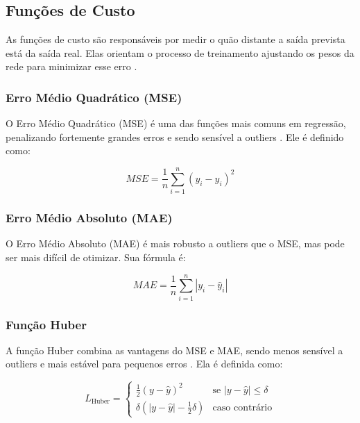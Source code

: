 \subsection{Funções de Custo}

As funções de custo são responsáveis por medir o quão distante a saída prevista está da saída real. Elas orientam o processo de treinamento ajustando os pesos da rede para minimizar esse erro \cite{rashid2020survey}.

\subsubsection{Erro Médio Quadrático (MSE)}

O Erro Médio Quadrático (MSE) é uma das funções mais comuns em regressão, penalizando fortemente grandes erros e sendo sensível a outliers \cite{goodfellow2016deep}. Ele é definido como:

\begin{equation}
    MSE = \frac{1}{n} \sum_{i=1}^{n} (y_i - \hat{y}_i)^2
    \label{eq:mse}
\end{equation}

\subsubsection{Erro Médio Absoluto (MAE)}

O Erro Médio Absoluto (MAE) é mais robusto a outliers que o MSE, mas pode ser mais difícil de otimizar. Sua fórmula é:

\begin{equation}
    MAE = \frac{1}{n} \sum_{i=1}^{n} |y_i - \hat{y}_i|
    \label{eq:mae}
\end{equation}

\subsubsection{Função Huber}

A função Huber combina as vantagens do MSE e MAE, sendo menos sensível a outliers e mais estável para pequenos erros \cite{huber1964robust}. Ela é definida como:

\begin{equation}
    L_{\text{Huber}} =
    \begin{cases}
        \frac{1}{2}(y - \hat{y})^2 & \text{se } |y - \hat{y}| \leq \delta \\
        \delta (|y - \hat{y}| - \frac{1}{2} \delta) & \text{caso contrário}
    \end{cases}
    \label{eq:huber}
\end{equation}

